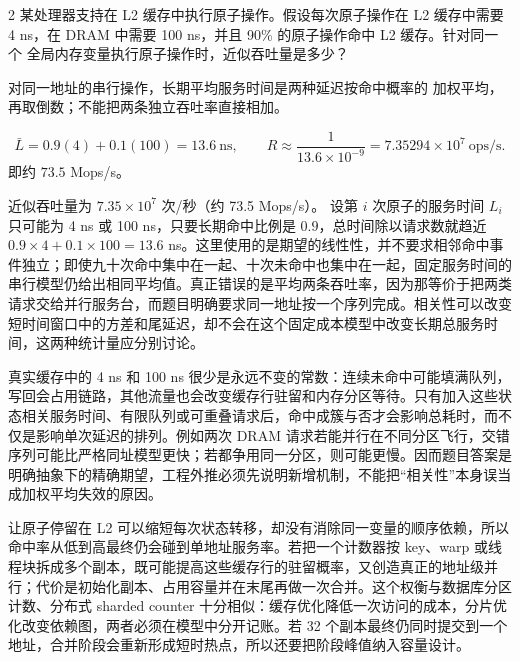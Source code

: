 \begin{solutionexercise}{2}
\problemheading 某处理器支持在 L2 缓存中执行原子操作。假设每次原子操作在 L2 缓存中需要
4 ns，在 DRAM 中需要 100 ns，并且 90\% 的原子操作命中 L2 缓存。针对同一个
全局内存变量执行原子操作时，近似吞吐量是多少？

\approachheading 对同一地址的串行操作，长期平均服务时间是两种延迟按命中概率的
加权平均，再取倒数；不能把两条独立吞吐率直接相加。

\answerheading
\[
\bar L=0.9(4)+0.1(100)=13.6\ \mathrm{ns},
\qquad
R\approx\frac1{13.6\times10^{-9}}
=7.35294\times10^7\ \mathrm{ops/s}.
\]
即约 $73.5$ Mops/s。

\conclusionheading 近似吞吐量为 $7.35\times10^7$ 次/秒（约 73.5 Mops/s）。
\discussionheading
{}设第 $i$ 次原子的服务时间 $L_i$ 只可能为 4 ns 或 100 ns，只要长期命中比例是 $0.9$，总时间除以请求数就趋近 $0.9\times4+0.1\times100=13.6$ ns。这里使用的是期望的线性性，并不要求相邻命中事件独立；即使九十次命中集中在一起、十次未命中也集中在一起，固定服务时间的串行模型仍给出相同平均值。真正错误的是平均两条吞吐率，因为那等价于把两类请求交给并行服务台，而题目明确要求同一地址按一个序列完成。相关性可以改变短时间窗口中的方差和尾延迟，却不会在这个固定成本模型中改变长期总服务时间，这两种统计量应分别讨论。

真实缓存中的 4 ns 和 100 ns 很少是永远不变的常数：连续未命中可能填满队列，写回会占用链路，其他流量也会改变缓存行驻留和内存分区等待。只有加入这些状态相关服务时间、有限队列或可重叠请求后，命中成簇与否才会影响总耗时，而不仅是影响单次延迟的排列。例如两次 DRAM 请求若能并行在不同分区飞行，交错序列可能比严格同址模型更快；若都争用同一分区，则可能更慢。因而题目答案是明确抽象下的精确期望，工程外推必须先说明新增机制，不能把“相关性”本身误当成加权平均失效的原因。

让原子停留在 L2 可以缩短每次状态转移，却没有消除同一变量的顺序依赖，所以命中率从低到高最终仍会碰到单地址服务率。若把一个计数器按 key、warp 或线程块拆成多个副本，既可能提高这些缓存行的驻留概率，又创造真正的地址级并行；代价是初始化副本、占用容量并在末尾再做一次合并。这个权衡与数据库分区计数、分布式 sharded counter 十分相似：缓存优化降低一次访问的成本，分片优化改变依赖图，两者必须在模型中分开记账。若 32 个副本最终仍同时提交到一个地址，合并阶段会重新形成短时热点，所以还要把阶段峰值纳入容量设计。


\end{solutionexercise}
